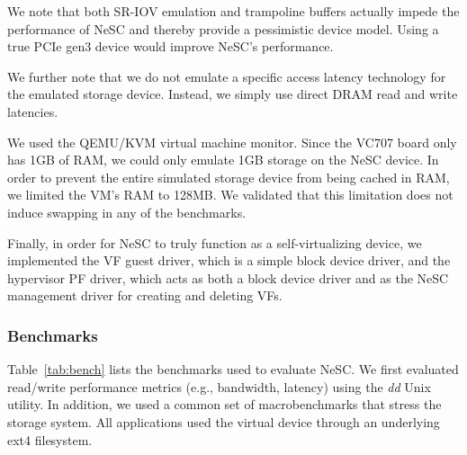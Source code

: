 We note that both SR-IOV emulation and trampoline buffers actually impede the performance of NeSC and thereby provide a pessimistic device model. Using a true PCIe gen3 device would improve NeSC's performance.

We further note that we do not emulate a specific access latency technology for the emulated storage device. Instead, we simply use direct DRAM read and write latencies.

We used the QEMU/KVM virtual machine monitor. Since the VC707 board only has 1GB of RAM, we could only emulate 1GB storage on the NeSC device. In order to prevent the entire simulated storage device from being cached in RAM, we limited the VM's RAM to 128MB. We validated that this limitation does not induce swapping in any of the benchmarks.

Finally, in order for NeSC to truly function as a self-virtualizing device, we implemented the VF guest driver, which is a simple block device driver,
and the hypervisor PF driver, which acts as both a block device driver and as the NeSC management driver for creating and deleting VFs.  

\subsubsection*{\bf Benchmarks}
Table~\ref{tab:bench} lists the benchmarks used to evaluate NeSC.
We first evaluated read/write performance metrics (e.g., bandwidth, latency) using the \emph{dd} Unix utility.
In addition, we used a common set of macrobenchmarks that stress the storage system.
All applications used the virtual device through an underlying ext4 filesystem.

